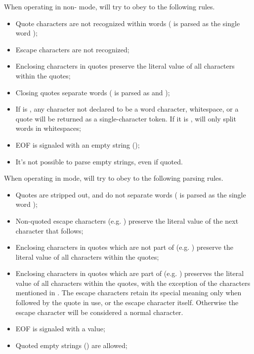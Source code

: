 When operating in non-\POSIX{} mode,  will try to obey to
the following rules.

\begin{itemize}
\item Quote characters are not recognized within words
      ( is parsed as the single word
      );
\item Escape characters are not recognized;
\item Enclosing characters in quotes preserve the literal value of
      all characters within the quotes;
\item Closing quotes separate words ( is parsed
      as  and );
\item If  is , any character not
      declared to be a word character, whitespace, or a quote will be
      returned as a single-character token. If it is ,
       will only split words in whitespaces;
\item EOF is signaled with an empty string ();
\item It's not possible to parse empty strings, even if quoted.
\end{itemize}

When operating in \POSIX{} mode,  will try to obey to the
following parsing rules.

\begin{itemize}
\item Quotes are stripped out, and do not separate words
      ( is parsed as the single word
      );
\item Non-quoted escape characters (e.g. \character{\textbackslash})
      preserve the literal value of the next character that follows;
\item Enclosing characters in quotes which are not part of
       (e.g. ) preserve the literal
      value of all characters within the quotes;
\item Enclosing characters in quotes which are part of
       (e.g. ) preserves the literal
      value of all characters within the quotes, with the exception of
      the characters mentioned in . The escape characters
      retain its special meaning only when followed by the quote in use,
      or the escape character itself. Otherwise the escape character
      will be considered a normal character.
\item EOF is signaled with a  value;
\item Quoted empty strings () are allowed;
\end{itemize}

